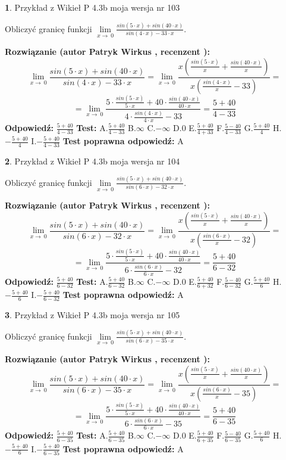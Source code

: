 \documentclass[12pt, a4paper]{article}
\theoremstyle{definition} %
\newtheorem{zad}{}
\newcommand{\zadStart}[1]{\begin{zad}#1\newline}
\newcommand{\zadStop}{\end{zad}}
\newcommand{\rozwStart}[2]{\noindent \textbf{Rozwiązanie (autor #1 , recenzent #2): }\newline}
\newcommand{\rozwStop}{\newline}
\newcommand{\odpStart}{\noindent \textbf{Odpowiedź:}\newline}
\newcommand{\odpStop}{\newline}
\newcommand{\testStart}{\noindent \textbf{Test:}\newline}
\newcommand{\testStop}{\newline}
\newcommand{\kluczStart}{\noindent \textbf{Test poprawna odpowiedź:}\newline}
\newcommand{\kluczStop}{\newline}
\begin{document}
\zadStart{Przykład z Wikieł P 4.3b moja wersja nr 103}


Obliczyć granicę funkcji $\lim\limits_{x\to\ 0}\frac{sin(5 \cdot x)+sin(40 \cdot x)}{sin(4 \cdot x)-33 \cdot x}$.
\zadStop
\rozwStart{Patryk Wirkus}{}
$$\lim\limits_{x\to\ 0}\frac{sin(5 \cdot x)+sin(40 \cdot x)}{sin(4 \cdot x)-33 \cdot x}=\lim\limits_{x\to\ 0}\frac{x(\frac{sin(5 \cdot x)}{x}+\frac{sin(40 \cdot x)}{x})}{x(\frac{sin(4 \cdot x)}{x}-33)}=$$
$$=\lim\limits_{x\to\ 0}\frac{5 \cdot \frac{sin(5 \cdot x)}{5 \cdot x}+40 \cdot \frac{sin(40 \cdot x)}{40 \cdot x}}{4 \cdot \frac{sin(4 \cdot x)}{4 \cdot x}-33}=\frac{5+40}{4-33}$$
\rozwStop
\odpStart
$\frac{5+40}{4-33}$
\odpStop
\testStart
A.$\frac{5+40}{4-33}$
B.$\infty$
C.$-\infty$
D.$0$
E.$\frac{5+40}{4+33}$
F.$\frac{5-40}{4-33}$
G.$\frac{5+40}{4}$
H.$-\frac{5+40}{4}$
I.$-\frac{5+40}{4-33}$
\testStop
\kluczStart
A
\kluczStop



\zadStart{Przykład z Wikieł P 4.3b moja wersja nr 104}


Obliczyć granicę funkcji $\lim\limits_{x\to\ 0}\frac{sin(5 \cdot x)+sin(40 \cdot x)}{sin(6 \cdot x)-32 \cdot x}$.
\zadStop
\rozwStart{Patryk Wirkus}{}
$$\lim\limits_{x\to\ 0}\frac{sin(5 \cdot x)+sin(40 \cdot x)}{sin(6 \cdot x)-32 \cdot x}=\lim\limits_{x\to\ 0}\frac{x(\frac{sin(5 \cdot x)}{x}+\frac{sin(40 \cdot x)}{x})}{x(\frac{sin(6 \cdot x)}{x}-32)}=$$
$$=\lim\limits_{x\to\ 0}\frac{5 \cdot \frac{sin(5 \cdot x)}{5 \cdot x}+40 \cdot \frac{sin(40 \cdot x)}{40 \cdot x}}{6 \cdot \frac{sin(6 \cdot x)}{6 \cdot x}-32}=\frac{5+40}{6-32}$$
\rozwStop
\odpStart
$\frac{5+40}{6-32}$
\odpStop
\testStart
A.$\frac{5+40}{6-32}$
B.$\infty$
C.$-\infty$
D.$0$
E.$\frac{5+40}{6+32}$
F.$\frac{5-40}{6-32}$
G.$\frac{5+40}{6}$
H.$-\frac{5+40}{6}$
I.$-\frac{5+40}{6-32}$
\testStop
\kluczStart
A
\kluczStop



\zadStart{Przykład z Wikieł P 4.3b moja wersja nr 105}


Obliczyć granicę funkcji $\lim\limits_{x\to\ 0}\frac{sin(5 \cdot x)+sin(40 \cdot x)}{sin(6 \cdot x)-35 \cdot x}$.
\zadStop
\rozwStart{Patryk Wirkus}{}
$$\lim\limits_{x\to\ 0}\frac{sin(5 \cdot x)+sin(40 \cdot x)}{sin(6 \cdot x)-35 \cdot x}=\lim\limits_{x\to\ 0}\frac{x(\frac{sin(5 \cdot x)}{x}+\frac{sin(40 \cdot x)}{x})}{x(\frac{sin(6 \cdot x)}{x}-35)}=$$
$$=\lim\limits_{x\to\ 0}\frac{5 \cdot \frac{sin(5 \cdot x)}{5 \cdot x}+40 \cdot \frac{sin(40 \cdot x)}{40 \cdot x}}{6 \cdot \frac{sin(6 \cdot x)}{6 \cdot x}-35}=\frac{5+40}{6-35}$$
\rozwStop
\odpStart
$\frac{5+40}{6-35}$
\odpStop
\testStart
A.$\frac{5+40}{6-35}$
B.$\infty$
C.$-\infty$
D.$0$
E.$\frac{5+40}{6+35}$
F.$\frac{5-40}{6-35}$
G.$\frac{5+40}{6}$
H.$-\frac{5+40}{6}$
I.$-\frac{5+40}{6-35}$
\testStop
\kluczStart
A
\kluczStop
\end{document}
